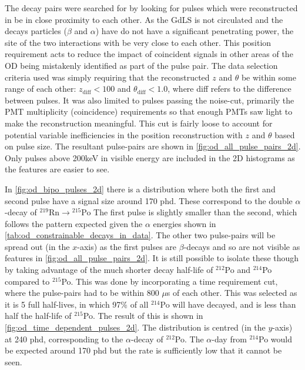 \par
The decay pairs were searched for by looking for pulses which were reconstructed in be in close proximity to each other.
As the GdLS is not circulated and the decays particles ($\beta$ and $\alpha$) have do not have a significant penetrating power, the site of the two interactions with be very close to each other.
This position requirement acts to reduce the impact of coincident signals in other areas of the OD being mistakenly identified as part of the pulse pair.
The data selection criteria used was simply requiring that the reconstructed $z$ and $\theta$ be within some range of each other: $z_{\text{diff}} < 100$ and $\theta_{\text{diff}} < 1.0$, where diff refers to the difference between pulses.
It was also limited to pulses passing the noise-cut, primarily the PMT multiplicity (coincidence) requirements so that enough PMTs saw light to make the reconstruction meaningful.
This cut is fairly loose to account for potential variable inefficiencies in the position reconstruction with $z$ and $\theta$ based on pulse size.
The resultant pulse-pairs are shown in \autoref{fig:od_all_pulse_pairs_2d}.
Only pulses above 200keV in visible energy are included in the 2D histograms as the features are easier to see.



\par
In \autoref{fig:od_bipo_pulses_2d} there is a distribution where both the first and second pulse have a signal size around 170 phd.
These correspond to the double $\alpha$-decay of ${}^{219}$Rn$\to{}^{215}$Po
The first pulse is slightly smaller than the second, which follows the pattern expected given the $\alpha$ energies shown in \autoref{tab:od_constrainable_decays_in_data}.
The other two pulse-pairs will be spread out (in the $x$-axis) as the first pulses are $\beta$-decays and so are not visible as features in \autoref{fig:od_all_pulse_pairs_2d}.
It is still possible to isolate these though by taking advantage of the much shorter decay half-life of ${}^{212}$Po and ${}^{214}$Po compared to ${}^{215}$Po.
This was done by incorporating a time requirement cut, where the pulse-pairs had to be within 800 $\mu$s of each other.
This was selected as it is 5 full half-lives, in which 97\% of all ${}^{214}$Po will have decayed, and is less than half the half-life of ${}^{215}$Po.
The result of this is shown in \autoref{fig:od_time_dependent_pulses_2d}.
The distribution is centred (in the $y$-axis) at 240 phd, corresponding to the $\alpha$-decay of ${}^{212}$Po.
The $\alpha$-day from ${}^{214}$Po would be expected around 170 phd but the rate is sufficiently low that it cannot be seen.

